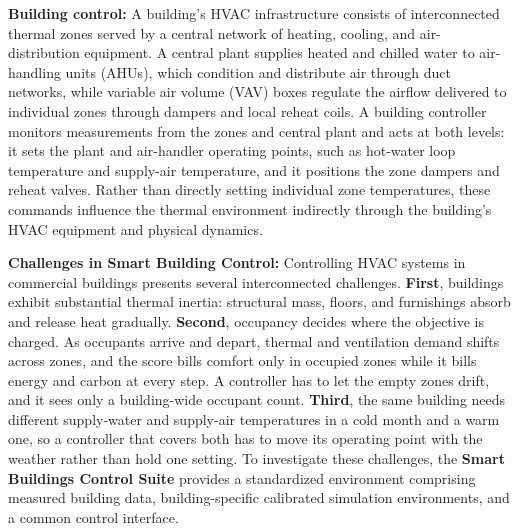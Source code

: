 \documentclass{article}
\begin{document}
\textbf{Building control:} A building's HVAC infrastructure consists of interconnected thermal zones served by a central network of heating, cooling, and air-distribution equipment. A central plant supplies heated and chilled water to air-handling units (AHUs), which condition and distribute air through duct networks, while variable air volume (VAV) boxes regulate the airflow delivered to individual zones through dampers and local reheat coils. A building controller monitors measurements from the zones and central plant and acts at both levels: it sets the plant and air-handler operating points, such as hot-water loop temperature and supply-air temperature, and it positions the zone dampers and reheat valves. Rather than directly setting individual zone temperatures, these commands influence the thermal environment indirectly through the building's HVAC equipment and physical dynamics.

\textbf{Challenges in Smart Building Control:} Controlling HVAC systems in commercial buildings presents several interconnected challenges. \textbf{First}, buildings exhibit substantial thermal inertia: structural mass, floors, and furnishings absorb and release heat gradually. \textbf{Second}, occupancy decides where the objective is charged. As occupants arrive and depart, thermal and ventilation demand shifts across zones, and the score bills comfort only in occupied zones while it bills energy and carbon at every step. A controller has to let the empty zones drift, and it sees only a building-wide occupant count. \textbf{Third}, the same building needs different supply-water and supply-air temperatures in a cold month and a warm one, so a controller that covers both has to move its operating point with the weather rather than hold one setting. To investigate these challenges, the \textbf{Smart Buildings Control Suite} \citep{goldfeder2024smart} provides a standardized environment comprising measured building data, building-specific calibrated simulation environments, and a common control interface.
\end{document}

